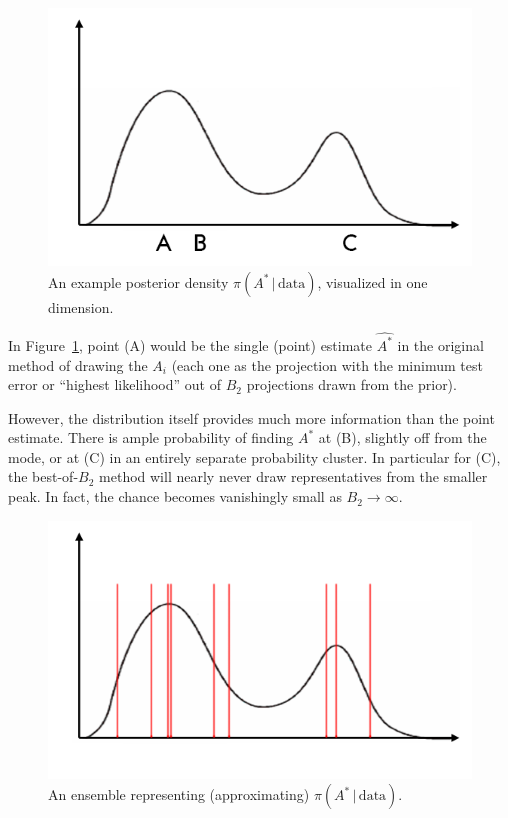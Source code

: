 \documentclass{amsart}
\begin{document}
\begin{figure}
\begin{centering}
\includegraphics[scale=0.3]{illustration1}
\caption{An example posterior density $\pi(A^*\,|\,\mathrm{data})$, visualized in one dimension.
\label{fig:illust1}}
\par\end{centering}
\end{figure}

In Figure~\ref{fig:illust1}, point (A) would be the single (point) estimate $\widehat{A^*}$ in the original method of drawing the $A_i$ (each one as the projection with the minimum test error or ``highest likelihood'' out of $B_2$ projections drawn from the prior).

However, the distribution itself provides much more information than the point estimate. There is ample probability of finding $A^*$ at (B), slightly off from the mode, or at (C) in an entirely separate probability cluster. In particular for (C), the best-of-$B_2$ method will nearly never draw representatives from the smaller peak. In fact, the chance becomes vanishingly small as $B_2\to\infty$.

\begin{figure}
\begin{centering}
\includegraphics[scale=0.3]{illustration2}
\par\end{centering}
\vspace{-20pt}
\caption{An ensemble representing (approximating) $\pi(A^*\,|\,\mathrm{data})$.}
\label{fig:illust2}
\end{figure}
\end{document}
